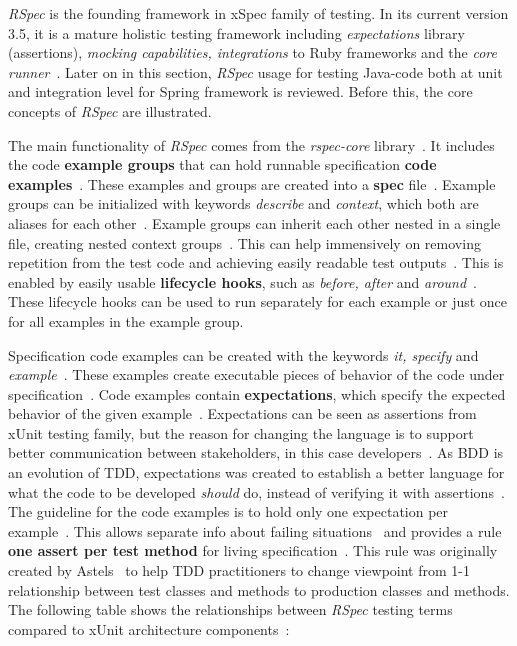     \textit{RSpec} is the founding framework in xSpec family of testing. In its current version 3.5, it is a mature holistic testing
    framework including \textit{expectations} library (assertions), \textit{mocking capabilities, integrations} to Ruby frameworks and the \textit{core runner}~\cite{rspecdoc}.
    Later on in this section, \textit{RSpec} usage for testing Java-code both at unit and integration level for Spring framework is reviewed.
    Before this, the core concepts of \textit{RSpec} are illustrated.

    The main functionality of \textit{RSpec} comes from the \textit{rspec-core} library~\cite{rspecdoc}. It includes the code \textbf{example groups} that can hold runnable
    specification \textbf{code examples}~\cite{chelimsky2010rspec}. These examples and groups are created into a \textbf{spec} file~\cite{chelimsky2010rspec}.
    Example groups can be initialized with keywords \textit{describe}
    and \textit{context}, which both are aliases for each other~\cite{rspec-core}. Example groups can inherit each other nested in a single
    file, creating nested context groups~\cite{rspec-core}. This can help immensively on removing
    repetition from the test code
    and achieving easily readable test outputs~\cite{chelimsky2010rspec}. This is enabled by easily usable \textbf{lifecycle hooks},
    such as \textit{before, after} and \textit{around}~\cite{chelimsky2010rspec}.
    These lifecycle hooks can be used to run separately for each example or just once for all examples in the example group.

    Specification code examples can be created with the keywords \textit{it, specify} and \textit{example}~\cite{rspec-core}.
    These examples create executable pieces of behavior of the code under specification~\cite{chelimsky2010rspec}. Code examples
    contain \textbf{expectations}, which specify the expected behavior of the given example~\cite{chelimsky2010rspec}. Expectations can
    be seen as assertions from xUnit testing family, but the reason for changing the language is to support better communication
    between stakeholders, in this case developers~\cite{chelimsky2010rspec}. As BDD is an evolution of TDD, expectations
    was created to establish a better language for what the code to be developed \textit{should} do, instead of verifying it
    with assertions~\cite{astels2006new}. The guideline for the code examples is to hold only one expectation per example~\cite{chelimsky2010rspec}.
    This allows separate info about failing situations~\cite{chelimsky2010rspec} and provides a rule \textbf{one assert per test method}
    for living specification~\cite{astels2006new}. This rule was originally created by Astels~\cite{astels2006new} to
    help TDD practitioners to change viewpoint from 1-1 relationship between test classes and methods to production classes
    and methods.
    The following table shows the relationships between \textit{RSpec} testing terms compared to xUnit architecture components~\cite{chelimsky2010rspec}:

